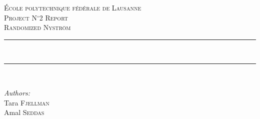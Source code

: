 \begin{titlepage}
    \newcommand{\HRule}{\rule{\linewidth}{0.5mm}} %
    
    \center  %
     
    
    \vspace{3cm}
    \textsc{\LARGE École polytechnique fédérale de Lausanne}\\[1.5cm] %
    
    \textsc{\Large Project N$^\circ$2 Report}\\[0.5cm] %
    \textsc{\large Randomized Nystr\"om
    }\\[0.5cm] %
    
    
    \HRule \\[0.4cm] %
    
    
    
    \HRule \\[1.5cm]
     
    
    \begin{minipage}{0.4\textwidth}
    \begin{flushleft} \large
    
    \emph{Authors:}\\
    Tara \textsc{Fjellman}\\
    Amal \textsc{Seddas}\\
    
    
    
    
    \end{flushleft}
    \end{minipage}
    ~
    \begin{minipage}{0.4\textwidth}
    \begin{flushright} \large
    

\end{flushright}
\end{minipage}
\end{titlepage}
